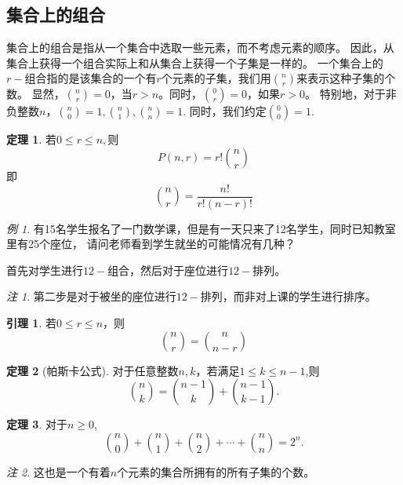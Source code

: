 \documentclass[a4paper,11pt]{article}%
\theoremstyle{remark}
\newtheorem*{remark}{注}
\theoremstyle{remark}
\newtheorem*{example}{例}
\theoremstyle{definition}
\newtheorem{theorem}{定理}[section]
\theoremstyle{definition}
\theoremstyle{definition}
\newtheorem{corollary}{引理}[section]
\begin{document}
\subsection{集合上的组合}
集合上的组合是指从一个集合中选取一些元素，而不考虑元素的顺序。
因此，从集合上获得一个组合实际上和从集合上获得一个子集是一样的。
一个集合上的$r-$组合指的是该集合的一个有$r$个元素的子集，我们用$\binom{n}{r}$来表示这种子集的个数。
显然，$\binom{n}{r}=0$，当$r>n$。同时，$\binom{0}{r}=0$，如果$r>0$。
特别地，对于非负整数$n$，$\binom{n}{0}=1,\binom{n}{1},\binom{n}{n}=1.$
同时，我们约定$\binom{0}{0}=1.$
\begin{theorem}
    若$0\leq r\leq n,$则
    \[P(n,r)=r!\binom{n}{r}\]
    即
    \[\binom{n}{r}=\frac{n!}{r!(n-r)!}\]
\end{theorem}
\begin{example}
    有15名学生报名了一门数学课，但是有一天只来了12名学生，同时已知教室里有25个座位，
    请问老师看到学生就坐的可能情况有几种？

    首先对学生进行$12-$组合，然后对于座位进行$12-$排列。
    \begin{remark}
        第二步是对于被坐的座位进行$12-$排列，而非对上课的学生进行排序。
    \end{remark}
\end{example}
\begin{corollary}
    若$0\leq r\leq n$，则
    \[\binom{n}{r}=\binom{n}{n-r}\]
\end{corollary}
\begin{theorem}[帕斯卡公式]
    对于任意整数$n,k$，若满足$1\leq k\leq n-1$,则
    \[\binom{n}{k}=\binom{n-1}{k}+\binom{n-1}{k-1}.\]
\end{theorem}
\begin{theorem}
    对于$n\geq 0$,
    \[\binom{n}{0}+\binom{n}{1}+\binom{n}{2}+\cdots+\binom{n}{n}=2^n.\]
\end{theorem}
\begin{remark}
    这也是一个有着$n$个元素的集合所拥有的所有子集的个数。
\end{remark}
\end{document}
